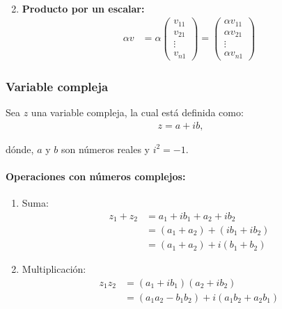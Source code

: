 \begin{enumerate}
\begin{align*}
    \end{align*}
    \item \textbf{Producto por un escalar:} \begin{align*}
        \alpha v &= \alpha \begin{pmatrix} v_{11} \\ v_{21} \\ \vdots \\ v_{n1} \end{pmatrix} = \begin{pmatrix} \alpha v_{11} \\ \alpha v_{21} \\ \vdots \\ \alpha v_{n1} \end{pmatrix}
    \end{align*}
\end{enumerate}


\subsubsection{Variable compleja}
\label{sec:variable_compleja}

Sea $z$ una variable compleja, la cual está definida como: \begin{align}
    z = a + ib,
    \label{eq:1.1.3}
\end{align}

dónde, $a$ y $b$ son números reales y $i^2 = -1$.

\paragraph*{Operaciones con números complejos:}

\begin{enumerate}
    \item Suma: \begin{align*}
        z_1 + z_2 &= a_1 + ib_1 + a_2 + ib_2 \\
                    &= (a_1 + a_2) + (ib_1 + ib_2) \\
                    &= (a_1 + a_2) + i(b_1 + b_2)
    \end{align*}
    \item Multiplicación: \begin{align*}
        z_1 z_2 &= (a_1 + ib_1)(a_2 + ib_2) \\
                &= (a_1a_2 - b_1b_2) + i(a_1b_2 + a_2b_1)
    \end{align*}
\end{enumerate}

